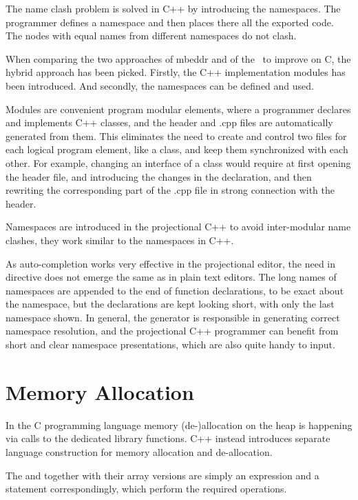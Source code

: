 The name clash problem is solved in C++ by introducing the namespaces. The programmer defines a namespace 
and then places there all the exported code. The nodes with equal names from different namespaces do not clash.

When comparing the two approaches of mbeddr and of the \cpppl\ to improve on C, the hybrid approach
has been picked. Firstly, the C++ implementation modules has been introduced. And secondly, the namespaces
can be defined and used.

Modules are convenient program modular elements, where a programmer declares and implements C++ classes,
and the header and .cpp files are automatically generated from them. This eliminates the need to 
create and control two files for each logical program element, like a class, and keep them synchronized with
each other. For example, changing an interface of a class would require at first opening the header file, 
and introducing the changes in the declaration, and then rewriting the corresponding part of the .cpp file 
in strong connection with the header.

Namespaces are introduced in the projectional C++ to avoid inter-modular name clashes, they work similar to 
the namespaces in C++.

As auto-completion works very effective in the projectional editor, the need in  directive does
not emerge the same as in plain text editors. The long names of namespaces are appended to the end of function 
declarations, to be exact about the namespace, but the declarations are kept looking short, with only 
the last namespace shown. In general, the generator is responsible in generating correct namespace 
resolution, and the projectional C++ programmer can benefit from short and clear namespace
presentations, which are also quite handy to input.

\section{Memory Allocation}

In the C programming language memory (de-)allocation on the heap is happening via calls to the dedicated library functions. 
C++ instead introduces separate language construction for memory allocation and de-allocation. 

The  and  together with their array versions are simply an expression and a statement correspondingly,
which perform the required operations.

